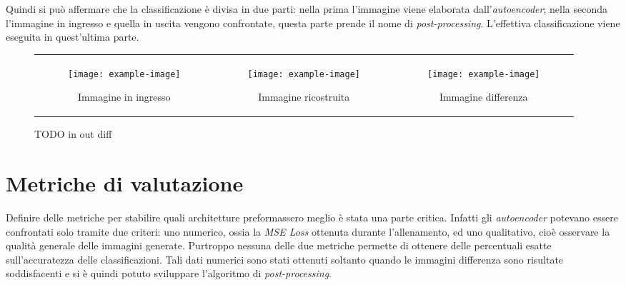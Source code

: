 Quindi si può affermare che la classificazione è divisa in due parti: nella prima l'immagine viene elaborata dall'\textit{autoencoder}; nella seconda l'immagine in ingresso e quella in uscita vengono confrontate, questa parte prende il nome di \textit{post-processing}.
L'effettiva classificazione viene eseguita in quest'ultima parte.

\begin{figure}[ht] %
  \begin{center}
    \begin{tabular}{ccc}

      \begin{subfigure}{.3\linewidth}
        \centering\texttt{[image: example-image]}
        \caption{Immagine in ingresso}
        \label{fig:obbiettivo_in}
      \end{subfigure} &

      \begin{subfigure}{.3\linewidth}
        \centering\texttt{[image: example-image]}
        \caption{Immagine ricostruita}
        \label{fig:obbiettivo_out}
      \end{subfigure} &

      \begin{subfigure}{.3\linewidth}
        \centering\texttt{[image: example-image]}
        \caption{Immagine differenza}
        \label{fig:obbiettivo_diff}
      \end{subfigure}

    \end{tabular}
    \caption{TODO in out diff}
    \label{fig:obbiettivo_in_out_diff}
  \end{center}
\end{figure}

\section{Metriche di valutazione}
Definire delle metriche per stabilire quali architetture preformassero meglio è stata una parte critica.
Infatti gli \textit{autoencoder} potevano essere confrontati solo tramite due criteri: uno numerico, ossia la \textit{MSE Loss} ottenuta durante l'allenamento, ed uno qualitativo, cioè osservare la qualità generale delle immagini generate.
Purtroppo nessuna delle due metriche permette di ottenere delle percentuali esatte sull'accuratezza delle classificazioni.
Tali dati numerici sono stati ottenuti soltanto quando le immagini differenza sono risultate soddisfacenti e si è quindi potuto sviluppare l'algoritmo di \textit{post-processing}.


